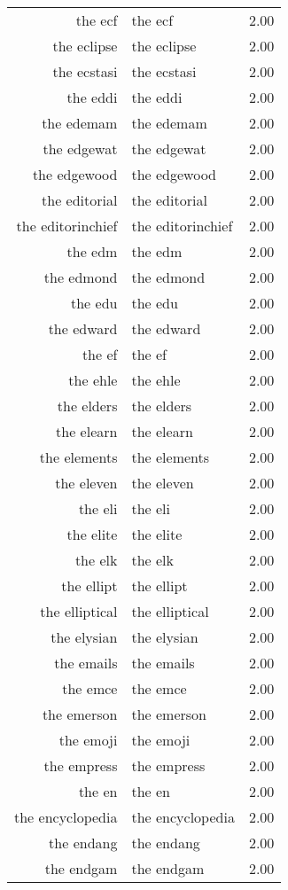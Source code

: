\begin{table}[ht]
\begin{tabular}{rlr}
  the ecf & the ecf & 2.00 \\ 
  the eclipse & the eclipse & 2.00 \\ 
  the ecstasi & the ecstasi & 2.00 \\ 
  the eddi & the eddi & 2.00 \\ 
  the edemam & the edemam & 2.00 \\ 
  the edgewat & the edgewat & 2.00 \\ 
  the edgewood & the edgewood & 2.00 \\ 
  the editorial & the editorial & 2.00 \\ 
  the editorinchief & the editorinchief & 2.00 \\ 
  the edm & the edm & 2.00 \\ 
  the edmond & the edmond & 2.00 \\ 
  the edu & the edu & 2.00 \\ 
  the edward & the edward & 2.00 \\ 
  the ef & the ef & 2.00 \\ 
  the ehle & the ehle & 2.00 \\ 
  the elders & the elders & 2.00 \\ 
  the elearn & the elearn & 2.00 \\ 
  the elements & the elements & 2.00 \\ 
  the eleven & the eleven & 2.00 \\ 
  the eli & the eli & 2.00 \\ 
  the elite & the elite & 2.00 \\ 
  the elk & the elk & 2.00 \\ 
  the ellipt & the ellipt & 2.00 \\ 
  the elliptical & the elliptical & 2.00 \\ 
  the elysian & the elysian & 2.00 \\ 
  the emails & the emails & 2.00 \\ 
  the emce & the emce & 2.00 \\ 
  the emerson & the emerson & 2.00 \\ 
  the emoji & the emoji & 2.00 \\ 
  the empress & the empress & 2.00 \\ 
  the en & the en & 2.00 \\ 
  the encyclopedia & the encyclopedia & 2.00 \\ 
  the endang & the endang & 2.00 \\ 
  the endgam & the endgam & 2.00 \\ 

\end{tabular}
\end{table}
